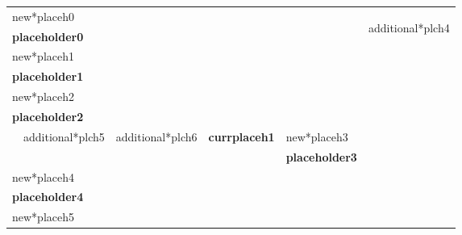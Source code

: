 \documentclass{article}
\begin{document}
\begin{table}[h]
{\setlength{\tabcolsep}{0.5em}
\begin{tabularx}{\textwidth}{|Xccll|c|}
\hline
\multicolumn{5}{|l|}{new*placeh0}                                                                                    & \multirow{22}{*}{ \begin{sideways}additional*plch4\end{sideways}} \\
\multicolumn{5}{|l|}{\textbf{placeholder0}}                                                                                                  &                                             \\
\multicolumn{5}{|l|}{new*placeh1}                                                                                &                                             \\
\multicolumn{5}{|l|}{\textbf{placeholder1}}                                                                                                  &                                             \\ \cline{1-5}
\multicolumn{5}{|l|}{new*placeh2}                                                                              &                                             \\
\multicolumn{5}{|l|}{\textbf{placeholder2}}                                                                                                  &                                             \\ \cline{2-3} \cline{5-5}
 & \multicolumn{1}{|l|}{additional*plch5}      & \multicolumn{1}{l|}{additional*plch6}      & \multicolumn{1}{X|}{\centering \textbf{currplaceh1}}      & new*placeh3                    &                                             \\ \cline{2-3}
&                             &                             & \multicolumn{1}{l|}{}                  &  \textbf{placeholder3}                &                                             \\ \cline{1-5}
\multicolumn{5}{|l|}{new*placeh4}                                                                         &                                             \\
\multicolumn{5}{|l|}{\textbf{placeholder4}}                                                                                                  &                                             \\
\multicolumn{5}{|l|}{new*placeh5}                                                                               &                                             \\

\end{tabularx}}
\end{table}
\end{document}
